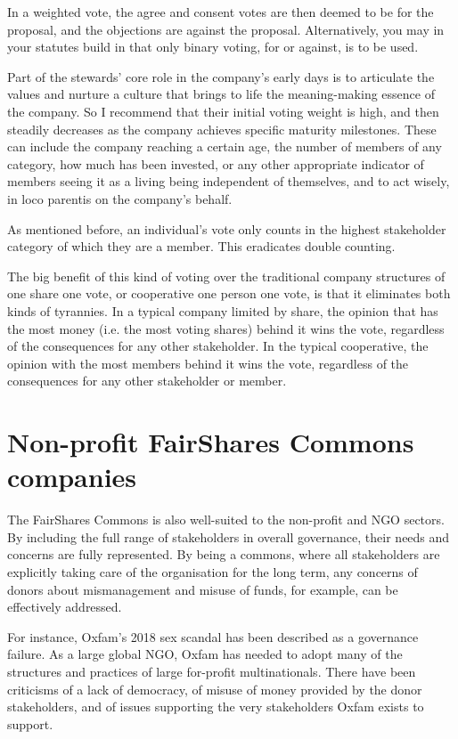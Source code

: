 In a weighted vote, the agree and consent votes are then deemed to be for the proposal, and the objections are against the proposal. Alternatively, you may in your statutes build in that only binary voting, for or against, is to be used.


Part of the stewards’ core role in the company’s early days is to articulate the values and nurture a culture that brings to life the meaning\hyp{}making essence of the company. So I recommend that their initial voting weight is high, and then steadily decreases as the company achieves specific maturity milestones. These can include the company reaching a certain age, the number of members of any category, how much has been invested, or any other appropriate indicator of members seeing it as a living being independent of themselves, and to act wisely, in loco parentis on the company’s behalf.


As mentioned before, an individual's vote only counts in the highest stakeholder category of which they are a member. This eradicates double counting.


The big benefit of this kind of voting over the traditional company structures of one share one vote, or cooperative one person one vote, is that it eliminates both kinds of tyrannies. In a typical company limited by share, the opinion that has the most money (i.e. the most voting shares) behind it wins the vote, regardless of the consequences for any other stakeholder. In the typical cooperative, the opinion with the most members behind it wins the vote, regardless of the consequences for any other stakeholder or member. 
\section{Non-profit FairShares Commons companies}
The FairShares Commons is also well-suited to the non-profit and NGO sectors. By including the full range of stakeholders in overall governance, their needs and concerns are fully represented. By being a commons, where all stakeholders are explicitly taking care of the organisation for the long term, any concerns of donors about mismanagement and misuse of funds, for example, can be effectively addressed.


For instance, Oxfam’s 2018 sex scandal has been described as a governance\cite{khan-oxfam-governance} failure. As a large global NGO, Oxfam has needed to adopt many of the structures and practices of large for-profit multinationals. There have been criticisms of a lack of democracy, of misuse of money provided by the donor stakeholders, and of issues supporting the very stakeholders Oxfam exists to support.


